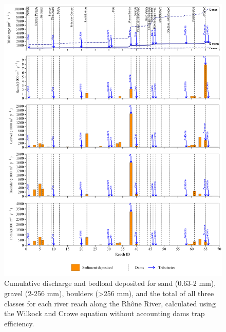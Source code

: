 \documentclass[
]{book}
\begin{document}
\begin{figure}
\includegraphics[width=26.24in]{img/res_cascade/res_E0_eW&C_noDams/plots_dep-silt/dep_res_sum_hy_E0_eW&C_noDams} \caption{Cumulative discharge and bedload deposited for sand (0.63-2 mm), gravel (2-256 mm), boulders (>256 mm), and the total of all three classes for each river reach along the Rhône River, calculated using the Wilkock and Crowe equation without accounting dams trap efficiency.}\label{fig:DepE0eW}
\end{figure}
\end{document}
